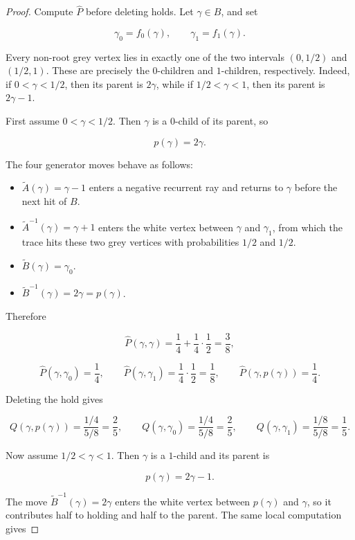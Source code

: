 \documentclass[11pt,a4paper]{scrartcl}
\begin{document}
\begin{proof}
Compute \(\widehat P\) before deleting holds. Let
\(\gamma\in B\), and set

\[
\gamma_0=f_0(\gamma),
\qquad
\gamma_1=f_1(\gamma).
\]

Every non-root grey vertex lies in exactly one of the two intervals
\((0,1/2)\) and \((1/2,1)\). These are precisely the \(0\)-children and
\(1\)-children, respectively. Indeed, if \(0<\gamma<1/2\), then its parent is
\(2\gamma\), while if \(1/2<\gamma<1\), then its parent is \(2\gamma-1\).

First assume \(0<\gamma<1/2\). Then \(\gamma\) is a \(0\)-child of its parent,
so

\[
p(\gamma)=2\gamma.
\]

The four generator moves behave as follows:

\begin{itemize}[leftmargin=*]
\item \(\widetilde A(\gamma)=\gamma-1\) enters a negative recurrent ray and
  returns to \(\gamma\) before the next hit of \(B\).
\item \(\widetilde A^{-1}(\gamma)=\gamma+1\) enters the white vertex between
  \(\gamma\) and \(\gamma_1\), from which the trace hits these two grey
  vertices with probabilities \(1/2\) and \(1/2\).
\item \(\widetilde B(\gamma)=\gamma_0\).
\item \(\widetilde B^{-1}(\gamma)=2\gamma=p(\gamma)\).
\end{itemize}

Therefore

\[
\widehat P(\gamma,\gamma)=\frac14+\frac14\cdot\frac12=\frac38,
\]

\[
\widehat P(\gamma,\gamma_0)=\frac14,
\qquad
\widehat P(\gamma,\gamma_1)=\frac14\cdot\frac12=\frac18,
\qquad
\widehat P(\gamma,p(\gamma))=\frac14 .
\]

Deleting the hold gives

\[
Q(\gamma,p(\gamma))=\frac{1/4}{5/8}=\frac25,
\qquad
Q(\gamma,\gamma_0)=\frac{1/4}{5/8}=\frac25,
\qquad
Q(\gamma,\gamma_1)=\frac{1/8}{5/8}=\frac15 .
\]

Now assume \(1/2<\gamma<1\). Then \(\gamma\) is a \(1\)-child and its parent is

\[
p(\gamma)=2\gamma-1.
\]

The move \(\widetilde B^{-1}(\gamma)=2\gamma\) enters the white vertex between
\(p(\gamma)\) and \(\gamma\), so it contributes half to holding and half to
the parent. The same local computation gives


\end{proof}
\end{document}
